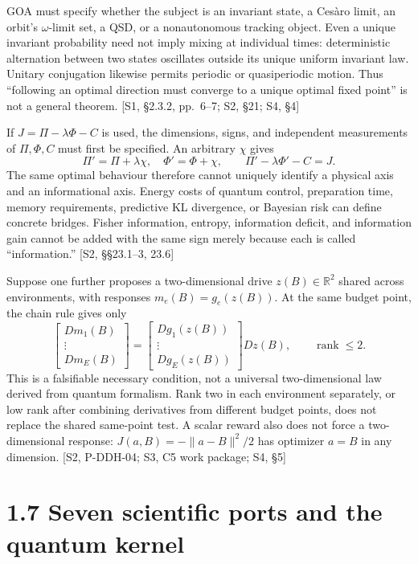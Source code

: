 \documentclass[
  11pt,
  oneside]{book}
\begin{document}
GOA must specify whether the subject is an invariant state, a Cesàro
limit, an orbit's \(\omega\)-limit set, a QSD, or a nonautonomous
tracking object. Even a unique invariant probability need not imply
mixing at individual times: deterministic alternation between two states
oscillates outside its unique uniform invariant law. Unitary conjugation
likewise permits periodic or quasiperiodic motion. Thus ``following an
optimal direction must converge to a unique optimal fixed point'' is not
a general theorem. {[}S1, §2.3.2, pp.~6--7; S2, §21; S4, §4{]}

If \(J=\Pi-\lambda\Phi-C\) is used, the dimensions, signs, and
independent measurements of \(\Pi,\Phi,C\) must first be specified. An
arbitrary \(\chi\) gives \[
\Pi'=\Pi+\lambda\chi,\quad \Phi'=\Phi+\chi,
\qquad \Pi'-\lambda\Phi'-C=J.
\] The same optimal behaviour therefore cannot uniquely identify a
physical axis and an informational axis. Energy costs of quantum
control, preparation time, memory requirements, predictive KL
divergence, or Bayesian risk can define concrete bridges. Fisher
information, entropy, information deficit, and information gain cannot
be added with the same sign merely because each is called
``information.'' {[}S2, §§23.1--3, 23.6{]}

Suppose one further proposes a two-dimensional drive
\(z(B)\in\mathbb R^2\) shared across environments, with responses
\(m_e(B)=g_e(z(B))\). At the same budget point, the chain rule gives
only \[
\begin{bmatrix}Dm_1(B)\\\vdots\\Dm_E(B)\end{bmatrix}
=\begin{bmatrix}Dg_1(z(B))\\\vdots\\Dg_E(z(B))\end{bmatrix}Dz(B),
\qquad\operatorname{rank}\le2.
\] This is a falsifiable necessary condition, not a universal
two-dimensional law derived from quantum formalism. Rank two in each
environment separately, or low rank after combining derivatives from
different budget points, does not replace the shared same-point test. A
scalar reward also does not force a two-dimensional response:
\(J(a,B)=-\|a-B\|^2/2\) has optimizer \(a=B\) in any dimension. {[}S2,
P-DDH-04; S3, C5 work package; S4, §5{]}

\section{1.7 Seven scientific ports and the quantum kernel}
\end{document}
